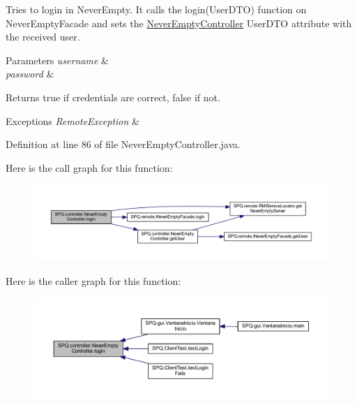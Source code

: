 Tries to login in Never\+Empty. It calls the login(\+User\+D\+T\+O) function on Never\+Empty\+Facade and sets the \mbox{\hyperlink{class_s_p_q_1_1controller_1_1_never_empty_controller}{Never\+Empty\+Controller}} User\+D\+TO attribute with the received user. 
\begin{DoxyParams}{Parameters}
{\em username} & \\
\hline
{\em password} & \\
\hline
\end{DoxyParams}
\begin{DoxyReturn}{Returns}
true if credentials are correct, false if not. 
\end{DoxyReturn}

\begin{DoxyExceptions}{Exceptions}
{\em Remote\+Exception} & \\
\hline
\end{DoxyExceptions}


Definition at line 86 of file Never\+Empty\+Controller.\+java.

Here is the call graph for this function\+:\nopagebreak
\begin{figure}[H]
\begin{center}
\leavevmode
\includegraphics[width=350pt]{class_s_p_q_1_1controller_1_1_never_empty_controller_adb8f5dbbfedb5f3c231de53dccc88899_cgraph}
\end{center}
\end{figure}
Here is the caller graph for this function\+:\nopagebreak
\begin{figure}[H]
\begin{center}
\leavevmode
\includegraphics[width=350pt]{class_s_p_q_1_1controller_1_1_never_empty_controller_adb8f5dbbfedb5f3c231de53dccc88899_icgraph}
\end{center}
\end{figure}
\mbox{\label{class_s_p_q_1_1controller_1_1_never_empty_controller_aefc0dae2c43c2960719176d390f3ad9c}} 

